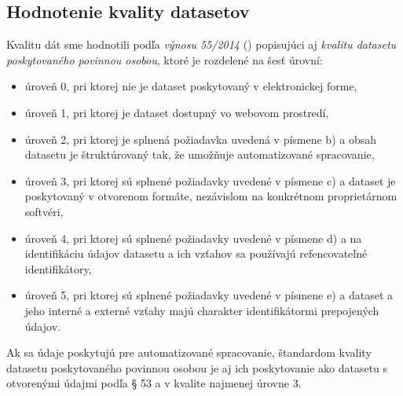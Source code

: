 \documentclass[12pt,a4paper]{article}
\begin{document}
\subsection*{Hodnotenie kvality datasetov}
\label{zakon-kvalita} 
Kvalitu dát sme hodnotili podľa \emph{výnosu 55/2014} (\cite{kvalita}) popisujúci aj \emph{kvalitu datasetu poskytovaného povinnou osobou}, ktoré je rozdelené na šesť úrovní: 
\begin{itemize} 
\item úroveň 0, pri ktorej nie je dataset poskytovaný
v elektronickej forme,
\item úroveň 1, pri ktorej je dataset dostupný vo webovom
prostredí,
\item úroveň 2, pri ktorej je splnená požiadavka uvedená
v písmene b) a obsah datasetu je štruktúrovaný tak,
že umožňuje automatizované spracovanie,
\item úroveň 3, pri ktorej sú splnené požiadavky uvedené
v písmene c) a dataset je poskytovaný v otvorenom
formáte, nezávislom na konkrétnom proprietárnom
softvéri,
\item úroveň 4, pri ktorej sú splnené požiadavky uvedené
v písmene d) a na identifikáciu údajov datasetu a ich
vzťahov sa používajú refencovateľné identifikátory,
\item úroveň 5, pri ktorej sú splnené požiadavky uvedené
v písmene e) a dataset a jeho interné a externé
vzťahy majú charakter identifikátormi prepojených
údajov.
\end{itemize} 

Ak sa údaje poskytujú pre automatizované spracovanie, štandardom kvality datasetu poskytovaného
povinnou osobou je aj ich poskytovanie ako datasetu s otvorenými údajmi podľa § 53 a v kvalite najmenej úrovne 3.
\end{document}
